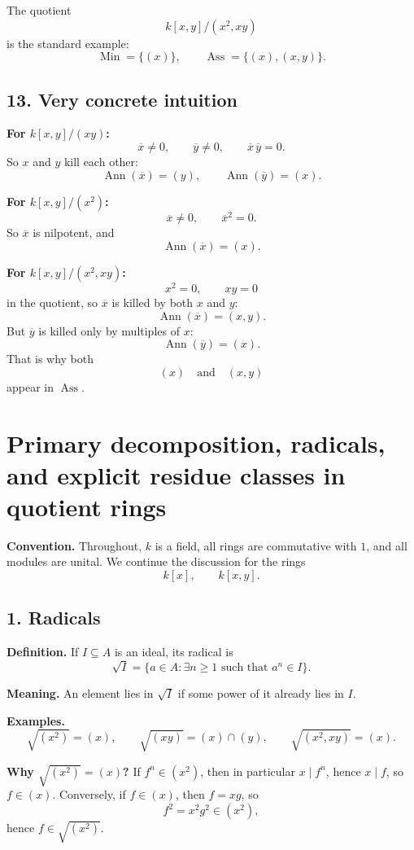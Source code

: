 \documentclass[12pt,a4paper]{article}
\theoremstyle{notespace}
\DeclareMathOperator{\Ass}{Ass}
\DeclareMathOperator{\Ann}{Ann}
\DeclareMathOperator{\Min}{Min}
\begin{document}
The quotient
\[
k[x,y]/(x^2,xy)
\]
is the standard example:
\[
\Min=\{(x)\},\qquad \Ass=\{(x),(x,y)\}.
\]

\subsection*{13. Very concrete intuition}

\textbf{For \(k[x,y]/(xy)\):}
\[
\overline x\neq 0,\qquad \overline y\neq 0,\qquad \overline x\,\overline y=0.
\]
So \(x\) and \(y\) kill each other:
\[
\Ann(\overline x)=(y),\qquad \Ann(\overline y)=(x).
\]

\textbf{For \(k[x,y]/(x^2)\):}
\[
\overline x\neq 0,\qquad \overline x^2=0.
\]
So \(\overline x\) is nilpotent, and
\[
\Ann(\overline x)=(x).
\]

\textbf{For \(k[x,y]/(x^2,xy)\):}
\[
x^2=0,\qquad xy=0
\]
in the quotient, so \(\overline x\) is killed by both \(x\) and \(y\):
\[
\Ann(\overline x)=(x,y).
\]
But \(\overline y\) is killed only by multiples of \(x\):
\[
\Ann(\overline y)=(x).
\]
That is why both
\[
(x)\quad \text{and}\quad (x,y)
\]
appear in \(\Ass\).

\section*{Primary decomposition, radicals, and explicit residue classes in quotient rings}

\textbf{Convention.}
Throughout, \(k\) is a field, all rings are commutative with \(1\), and all modules are unital.
We continue the discussion for the rings
\[
k[x],\qquad k[x,y].
\]

\subsection*{1. Radicals}

\textbf{Definition.}
If \(I\subseteq A\) is an ideal, its radical is
\[
\sqrt{I}=\{a\in A:\exists n\ge 1\text{ such that }a^n\in I\}.
\]

\textbf{Meaning.}
An element lies in \(\sqrt I\) if some power of it already lies in \(I\).

\textbf{Examples.}
\[
\sqrt{(x^2)}=(x),\qquad \sqrt{(xy)}=(x)\cap(y),\qquad \sqrt{(x^2,xy)}=(x).
\]

\textbf{Why \(\sqrt{(x^2)}=(x)\)?}
If \(f^n\in (x^2)\), then in particular \(x\mid f^n\), hence \(x\mid f\), so \(f\in (x)\).
Conversely, if \(f\in (x)\), then \(f=xg\), so
\[
f^2=x^2g^2\in (x^2),
\]
hence \(f\in \sqrt{(x^2)}\).
\end{document}
